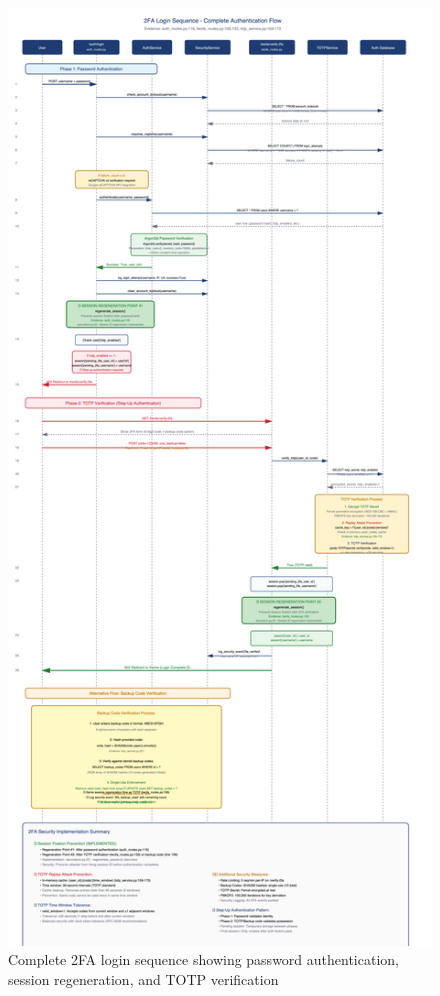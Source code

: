 \documentclass[12pt,a4paper]{article}
\begin{document}
\begin{figure}[H]
    \centering
    \includegraphics[width=\textwidth]{diagrams/5_2fa_login_sequence.png}
    \caption{Complete 2FA login sequence showing password authentication, session regeneration, and TOTP verification}
    \label{fig:2fa_flow}
\end{figure}
\end{document}
